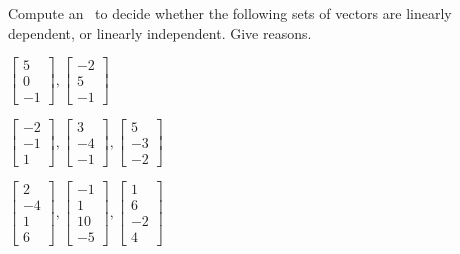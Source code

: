 \begin{exercise}  
Compute an \svd\ to decide whether the following sets of vectors are linearly dependent, or linearly independent.  Give reasons.
\begin{Parts}
\item \(\begin{bmatrix} 5\\0\\-1 \end{bmatrix}, \begin{bmatrix}-2\\5\\-1 \end{bmatrix}\)

\item \(\begin{bmatrix} -2\\-1\\1 \end{bmatrix}, \begin{bmatrix} 3\\-4\\-1 \end{bmatrix}, \begin{bmatrix} 5\\-3\\-2 \end{bmatrix}\)

\item \(\begin{bmatrix} 2\\-4\\1\\6 \end{bmatrix}, \begin{bmatrix} -1\\1\\10\\-5 \end{bmatrix}, \begin{bmatrix}1\\6\\-2\\4 \end{bmatrix}\)


\end{Parts}
\end{exercise}
